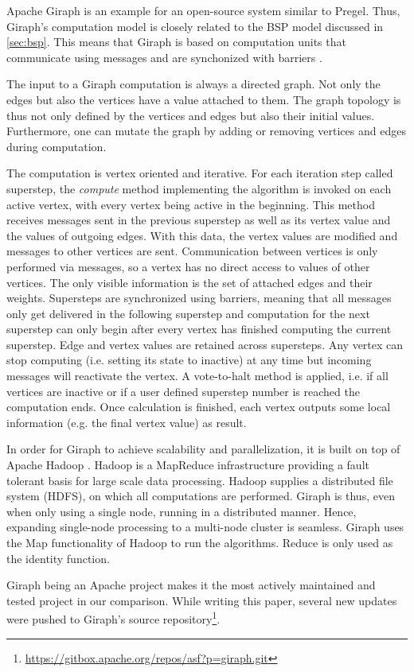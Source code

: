 Apache Giraph is an example for an open-source system similar to Pregel.
Thus, Giraph's computation model is closely related to the BSP model discussed in \autoref{sec:bsp}. 
This means that Giraph is based on computation units that communicate using messages and are synchonized with barriers \cite{Giraph}.

The input to a Giraph computation is always a directed graph. Not only the edges but also the vertices have a value attached to them. The graph topology is thus not only defined by the vertices and edges but also their initial values.
Furthermore, one can mutate the graph by adding or removing vertices and edges during computation.

The computation is vertex oriented and iterative.
For each iteration step called superstep, the \emph{compute} method implementing the algorithm is invoked on each active vertex, with every vertex being active in the beginning.
This method receives messages sent in the previous superstep as well as its vertex value and the values of outgoing edges.
With this data, the vertex values are modified and messages to other vertices are sent.
Communication between vertices is only performed via messages, so a vertex has no direct access to values of other vertices. The only visible information is the set of attached edges and their weights.
Supersteps are synchronized using barriers, meaning that all messages only get delivered in the following superstep and computation for the next superstep can only begin after every vertex has finished computing the current superstep.
Edge and vertex values are retained across supersteps.
Any vertex can stop computing (i.e. setting its state to inactive) at any time but incoming messages will reactivate the vertex.
A vote-to-halt method is applied, i.e. if all vertices are inactive or if a user defined superstep number is reached the computation ends.
Once calculation is finished, each vertex outputs some local information (e.g. the final vertex value) as result.

In order for Giraph to achieve scalability and parallelization, it is built on top of Apache Hadoop \cite{Giraph}.
Hadoop is a MapReduce infrastructure providing a fault tolerant basis for large scale data processing.
Hadoop supplies a distributed file system (HDFS), on which all computations are performed.
Giraph is thus, even when only using a single node, running in a distributed manner.
Hence, expanding single-node processing to a multi-node cluster is seamless.
Giraph uses the Map functionality of Hadoop to run the algorithms. Reduce is only used as the identity function.

Giraph being an Apache project makes it the most actively maintained and tested project in our comparison. While writing this paper, several new updates were pushed to Giraph's source repository\footnote{\url{https://gitbox.apache.org/repos/asf?p=giraph.git}}.
